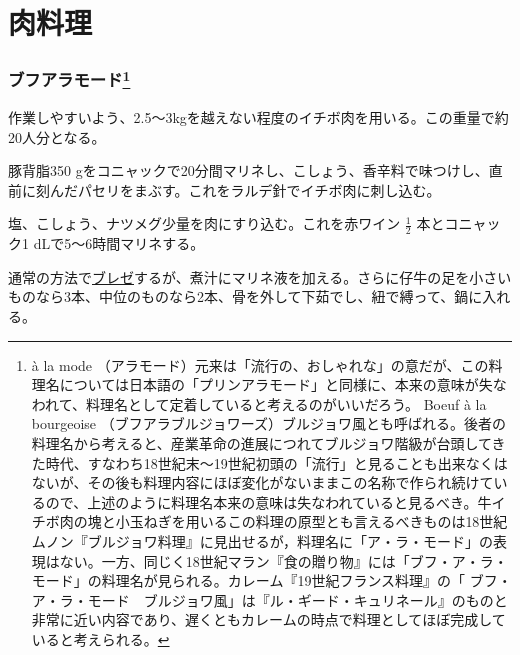\hypertarget{ux8089ux6599ux7406}{%
\section{肉料理}\label{ux8089ux6599ux7406}}
\begin{recette}
\hypertarget{boeuf-a-la-mode}{%
\subsubsection[ブフアラモード]{\texorpdfstring{ブフアラモード\footnote{à
  la mode
  （アラモード）元来は「流行の、おしゃれな」の意だが、この料理名については日本語の「プリンアラモード」と同様に、本来の意味が失なわれて、料理名として定着していると考えるのがいいだろう。
  Boeuf à la bourgeoise
  （ブフアラブルジョワーズ）ブルジョワ風とも呼ばれる。後者の料理名から考えると、産業革命の進展につれてブルジョワ階級が台頭してきた時代、すなわち18世紀末〜19世紀初頭の「流行」と見ることも出来なくはないが、その後も料理内容にほぼ変化がないままこの名称で作られ続けているので、上述のように料理名本来の意味は失なわれていると見るべき。牛イチボ肉の塊と小玉ねぎを用いるこの料理の原型とも言えるべきものは18世紀ムノン『ブルジョワ料理』に見出せるが，料理名に「ア・ラ・モード」の表現はない。一方、同じく18世紀マラン『食の贈り物』には「ブフ・ア・ラ・モード」の料理名が見られる。カレーム『19世紀フランス料理』の「
  ブフ・ア・ラ・モード　ブルジョワ風」は『ル・ギード・キュリネール』のものと非常に近い内容であり、遅くともカレームの時点で料理としてほぼ完成していると考えられる。}}{ブフアラモード}}\label{boeuf-a-la-mode}}



作業しやすいよう、2.5〜3kgを越えない程度のイチボ肉を用いる。この重量で約20人分となる。

豚背脂350
gをコニャックで20分間マリネし、こしょう、香辛料で味つけし、直前に刻んだパセリをまぶす。これをラルデ針でイチボ肉に刺し込む。

塩、こしょう、ナツメグ少量を肉にすり込む。これを赤ワイン \(\frac{1}{2}\)
本とコニャック1 dLで5〜6時間マリネする。

通常の方法で\protect\hyperlink{les-braises}{ブレゼ}するが、煮汁にマリネ液を加える。さらに仔牛の足を小さいものなら3本、中位のものなら2本、骨を外して下茹でし、紐で縛って、鍋に入れる。


\end{recette}

